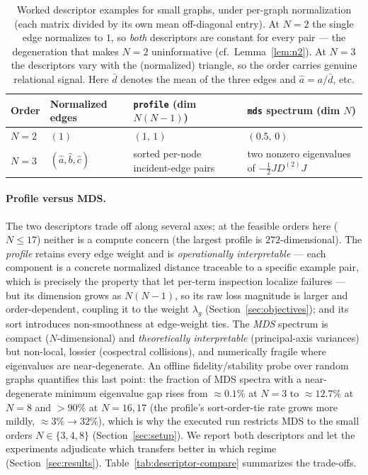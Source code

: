\documentclass[11pt,letterpaper]{article}
\begin{document}
\begin{table}[htbp]
    \centering
    \small
    \caption{Worked descriptor examples for small graphs, under per-graph
             normalization (each matrix divided by its own mean off-diagonal entry).
             At $N=2$ the single edge normalizes to $1$, so \emph{both} descriptors are
             constant for every pair --- the degeneration that makes $N=2$ uninformative
             (cf.\ Lemma~\ref{lem:n2}). At $N=3$ the descriptors vary with the (normalized)
             triangle, so the order carries genuine relational signal. Here $\bar d$
             denotes the mean of the three edges and $\hat a=a/\bar d$, etc.}
    \label{tab:descriptor-example}
    \begin{tabularx}{\linewidth}{@{}l l X X@{}}
        \toprule
        Order & Normalized edges & \texttt{profile} (dim $N(N{-}1)$) & \texttt{mds} spectrum (dim $N$) \\
        \midrule
        $N=2$ & $(1)$ & $(1,\,1)$ & $(0.5,\,0)$ \\
        $N=3$ & $(\hat a,\hat b,\hat c)$ & sorted per-node incident-edge pairs & two nonzero eigenvalues of $-\tfrac12 J D^{(2)} J$ \\
        \bottomrule
    \end{tabularx}
\end{table}

\paragraph{Profile versus MDS.} The two descriptors trade off along several axes; at
the feasible orders here ($N \leq 17$) neither is a compute concern (the largest
profile is $272$-dimensional). The \emph{profile} retains every edge weight and is
\emph{operationally interpretable} --- each component is a concrete normalized
distance traceable to a specific example pair, which is precisely the property that
let per-term inspection localize failures --- but its dimension grows as $N(N-1)$, so
its raw loss magnitude is larger and order-dependent, coupling it to the weight
$\lambda_g$ (Section~\ref{sec:objectives}); and its sort introduces non-smoothness at
edge-weight ties. The \emph{MDS} spectrum is compact ($N$-dimensional) and
\emph{theoretically interpretable} (principal-axis variances) but non-local, lossier
(cospectral collisions), and numerically fragile where eigenvalues are near-degenerate.
An offline fidelity/stability probe over random graphs quantifies this last point: the
fraction of MDS spectra with a near-degenerate minimum eigenvalue gap rises from
$\approx 0.1\%$ at $N=3$ to $\approx 12.7\%$ at $N=8$ and $>90\%$ at $N=16,17$ (the
profile's sort-order-tie rate grows more mildly, $\approx 3\%\!\to\!32\%$), which is why
the executed run restricts MDS to the small orders $N \in \{3,4,8\}$
(Section~\ref{sec:setup}). We report both descriptors and let the experiments adjudicate
which transfers better in which regime (Section~\ref{sec:results}).
Table~\ref{tab:descriptor-compare} summarizes the trade-offs.
\end{document}
